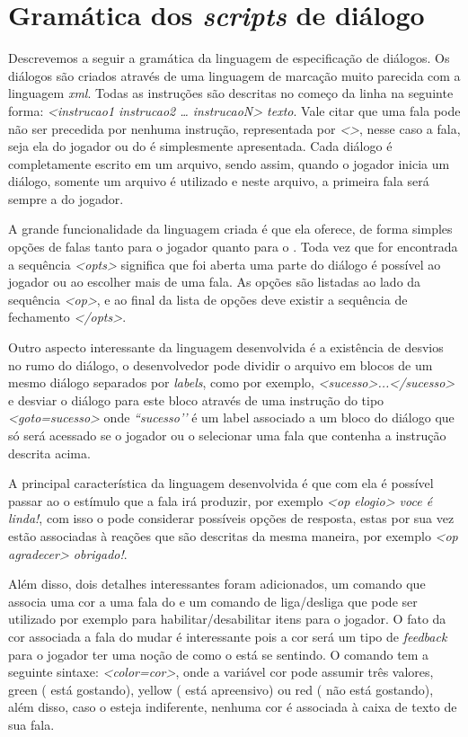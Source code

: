 \chapter{Gramática dos \emph{scripts} de
  diálogo}\label{ap:gram-script-dialogo}

Descrevemos a seguir a gramática da linguagem de especificação de diálogos.
Os diálogos são criados através de uma linguagem de marcação muito parecida com a linguagem \emph{xml}. Todas as instruções são descritas no começo da linha na seguinte forma: \emph{<instrucao1 instrucao2 … instrucaoN> texto}. Vale citar que uma fala pode não ser precedida por nenhuma instrução, representada por \emph{<>}, nesse caso a fala, seja ela do jogador ou do \npc{} é simplesmente apresentada.
Cada diálogo é completamente escrito em um arquivo, sendo assim, quando o jogador inicia um diálogo, somente um arquivo é utilizado e neste arquivo, a primeira fala será sempre a do jogador.

A grande funcionalidade da linguagem criada é que ela oferece, de forma simples opções de falas tanto para o jogador quanto para o \npc{}. Toda vez que for encontrada a sequência \emph{<opts>} significa que foi aberta uma parte do diálogo é possível ao jogador ou ao \npc{} escolher mais de uma fala. As opções são listadas ao lado da sequência \emph{<op>}, e ao final da lista de opções deve existir a sequência de fechamento \emph{</opts>}.

Outro aspecto interessante da linguagem desenvolvida é a existência de desvios no rumo do diálogo, o desenvolvedor pode dividir o arquivo em blocos de um mesmo diálogo separados por \emph{labels}, como por exemplo, \emph{<sucesso>...</sucesso>} e desviar o diálogo para este bloco através de uma instrução do tipo \emph{<goto=sucesso>} onde \emph{``sucesso’’} é um label associado a um bloco do diálogo que só será acessado se o jogador ou o \npc{} selecionar uma fala que contenha a instrução descrita acima.

A principal característica da linguagem desenvolvida é que com ela é possível passar ao \npc{} o estímulo que a fala irá produzir, por exemplo \emph{<op elogio> voce é linda!}, com isso o \npc pode considerar possíveis opções de resposta, estas por sua vez estão associadas à reações que são descritas da mesma maneira, por exemplo \emph{<op agradecer> obrigado!}. 

Além disso, dois detalhes interessantes foram adicionados, um comando que associa uma cor a uma fala do \npc{} e um comando de liga/desliga que pode ser utilizado por exemplo para habilitar/desabilitar itens para o jogador. O fato da cor associada a fala do \npc{} mudar é interessante pois a cor será um tipo de \emph{feedback} para o jogador ter uma noção de como o \npc{} está se sentindo. O comando tem a seguinte sintaxe: \emph{<color=cor>}, onde a variável cor pode assumir três valores, green (\npc{} está gostando), yellow (\npc{} está apreensivo) ou red (\npc{} não está gostando), além disso, caso o \npc{} esteja indiferente, nenhuma cor é associada à caixa de texto de sua fala. 

